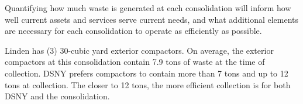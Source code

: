 
    Quantifying how much waste is generated at each consolidation will inform how well current assets and services serve current needs, and what additional elements are necessary for each consolidation to operate as efficiently as possible.
    
    Linden has (3) 30-cubic yard exterior compactors. On average, the exterior compactors at this consolidation contain 7.9 tons of waste at the time of collection. DSNY prefers compactors to contain more than 7 tons and up to 12 tons at collection. The closer to 12 tons, the more efficient collection is for both DSNY and the consolidation.